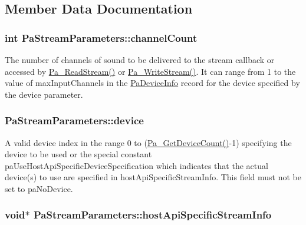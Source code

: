 \subsection{Member Data Documentation}
\hypertarget{struct_pa_stream_parameters_a861ff361da71fc2572dd356c9c9878ca}{
\subsubsection[{channel\+Count}]{\setlength{\rightskip}{0pt plus 5cm}int Pa\+Stream\+Parameters\+::channel\+Count}}\label{struct_pa_stream_parameters_a861ff361da71fc2572dd356c9c9878ca}
The number of channels of sound to be delivered to the stream callback or accessed by \hyperlink{portaudio_8h_a0b62d4b74b5d3d88368e9e4c0b8b2dc7}{Pa\+\_\+\+Read\+Stream()} or \hyperlink{portaudio_8h_a075a6efb503a728213bdae24347ed27d}{Pa\+\_\+\+Write\+Stream()}. It can range from 1 to the value of max\+Input\+Channels in the \hyperlink{struct_pa_device_info}{Pa\+Device\+Info} record for the device specified by the device parameter. \hypertarget{struct_pa_stream_parameters_aebaf648b4d11dd1252a747b76b8da084}{
\subsubsection[{device}]{ Pa\+Stream\+Parameters\+::device}}\label{struct_pa_stream_parameters_aebaf648b4d11dd1252a747b76b8da084}
A valid device index in the range 0 to (\hyperlink{portaudio_8h_acfe4d3c5ec1a343f459981bfa2057f8d}{Pa\+\_\+\+Get\+Device\+Count()}-\/1) specifying the device to be used or the special constant pa\+Use\+Host\+Api\+Specific\+Device\+Specification which indicates that the actual device(s) to use are specified in host\+Api\+Specific\+Stream\+Info. This field must not be set to pa\+No\+Device. \hypertarget{struct_pa_stream_parameters_aff01b9fa0710ad1654471e97665c06a9}{
\subsubsection[{host\+Api\+Specific\+Stream\+Info}]{\setlength{\rightskip}{0pt plus 5cm}void$\ast$ Pa\+Stream\+Parameters\+::host\+Api\+Specific\+Stream\+Info}}\label{struct_pa_stream_parameters_aff01b9fa0710ad1654471e97665c06a9}
